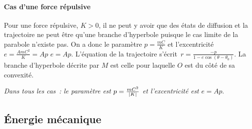 \paragraph{Cas d'une force répulsive}
Pour une force répulsive, \(K > 0\), il ne peut y avoir que des états de 
diffusion et la trajectoire ne peut être qu'une branche d'hyperbole puisque le 
cas limite de la parabole n'existe pas. On a donc le paramètre \(p = 
\frac{mC}{K}\) et l'excentricité \(e = \frac{AmC^2}{K} = Ap\) \(e = Ap\). 
L'équation de la trajectoire s'écrit~\(r = \frac{-p}{1 - e\cos(\theta - 
\theta_0)}\). La branche d'hyperbole décrite par \(M\) est celle pour laquelle 
\(O\) est du côté de sa convexité.

\emph{Dans tous les cas~: le paramètre est \(p=\frac{mC^2}{\left\lvert K\right\rvert}\) et 
l'excentricité est \(e = Ap\)}.
\subsection{Énergie mécanique}

